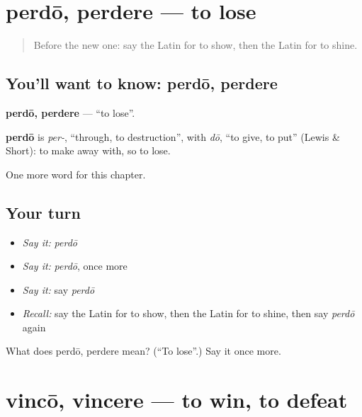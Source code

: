 \section[perdō, perdere]{perdō, perdere — to lose}

\label{lesson:LA-C157-perdo}



\begin{quote}
Before the new one: say the Latin for to show, then the Latin for to shine.
\end{quote}

\subsection*{You'll want to know: perdō, perdere}
\textbf{perdō, perdere} — \textquotedblleft{}to lose\textquotedblright{}.

\begin{cousinweb}
\textbf{perdō} is \emph{per-}, \textquotedblleft{}through, to destruction\textquotedblright{}, with \emph{dō}, \textquotedblleft{}to give, to put\textquotedblright{} (Lewis \& Short): to make away with, so to lose.
\end{cousinweb}

\begin{grammarlens}[title={What you've built}]
One more word for this chapter.
\end{grammarlens}

\subsection*{Your turn}
\begin{itemize}
\raggedright
  \item \emph{Say it:} \emph{perdō}
  \item \emph{Say it:} \emph{perdō}, once more
  \item \emph{Say it:} say \emph{perdō}
  \item \emph{Recall:} say the Latin for to show, then the Latin for to shine, then say \emph{perdō} again
\end{itemize}

\begin{tcolorbox}[breakable,colback=teal!4,colframe=teal!35!black,title={Before you move on}]
What does perdō, perdere mean? (\textquotedblleft{}To lose\textquotedblright{}.) Say it once more.
\end{tcolorbox}
\section[vincō, vincere]{vincō, vincere — to win, to defeat}

